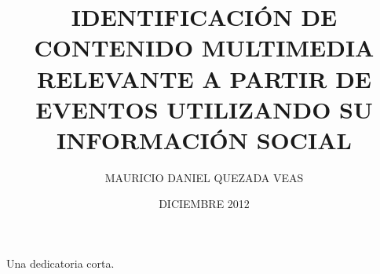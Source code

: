 \documentclass[upright, contnum]{umemoria}
\author{MAURICIO DANIEL QUEZADA VEAS}
\title{IDENTIFICACI\'ON DE CONTENIDO MULTIMEDIA RELEVANTE A PARTIR DE EVENTOS UTILIZANDO SU INFORMACI\'ON SOCIAL}
\date{DICIEMBRE 2012}
\begin{document}
\frontmatter
\maketitle

\begin{abstract}
\lipsum[1-4]
\end{abstract}

\begin{dedicatoria}
Una dedicatoria corta.
\end{dedicatoria}

\begin{thanks}
\lipsum[1-2]
\end{thanks}

\cleardoublepage
\tableofcontents
\listoffigures

\mainmatter








\nocite{*}


\end{document}
